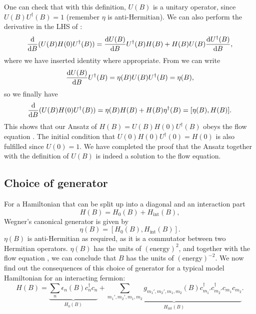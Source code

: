 \documentclass{article}
\begin{document}
One can check that with this definition, $U(B)$ is a unitary operator, since $U(B)U^{\dagger}(B)=1$ (remember $\eta$ is anti-Hermitian). We can also perform the derivative in the LHS of :
\begin{equation}
\diff{}{B}(U(B)H(0)U^{\dagger}(B))=\diff{U(B)}{B}U^{\dagger}(B)H(B)+H(B)U(B)\diff{U^{\dagger}(B)}{B},
\end{equation}
where we have inserted identity where appropriate. From  we can write
\begin{equation}
\diff{U(B)}{B}U^{\dagger}(B)=\eta(B)U(B)U^{\dagger}(B)=\eta(B),
\end{equation}
so we finally have
\begin{equation}
\diff{}{B}(U(B)H(0)U^{\dagger}(B))=\eta(B)H(B)+H(B)\eta^{\dagger}(B)=[\eta(B),H(B)].
\end{equation}
This shows that our Ansatz of $H(B)=U(B)H(0)U^{\dagger}(B)$ obeys the flow equation . The initial condition that $U(0)H(0)U^{\dagger}(0)=H(0)$ is also fulfilled since $U(0)=1$. We have completed the proof that the Ansatz together with the definition of $U(B)$ is indeed a solution to the flow equation.

\subsection{Choice of generator}
For a Hamiltonian that can be split up into a diagonal and an interaction part
\begin{equation}
H(B)=H_0(B)+H_{\mathrm{int}}(B),
\end{equation}
Wegner's canonical generator is given by
\begin{equation}
\eta(B)=[H_0(B),H_{\mathrm{int}}(B)].
\end{equation}
$\eta(B)$ is anti-Hermitian as required, as it is a commutator between two Hermitian operators. $\eta(B)$ has the units of $(\mathrm{energy})^{2}$, and together with the flow equation , we can conclude that $B$ has the units of $(\mathrm{energy})^{-2}$. We now find out the consequences of this choice of generator for a typical model Hamiltonian for an interacting fermion:
\begin{equation}
H(B)=\underbrace{ \sum_n\epsilon_n(B)c_n^{\dagger}c_n }_{H_0(B)}+\underbrace{ \sum_{m_1',m_2',m_1,m_2} g_{m_1',m_2',m_1,m_2}(B)c_{m_1'}^{\dagger}c_{m_2'}^{\dagger}c_{m_1}c_{m_2} }_{H_{\mathrm{int}}(B)}.
\end{equation}
\end{document}
